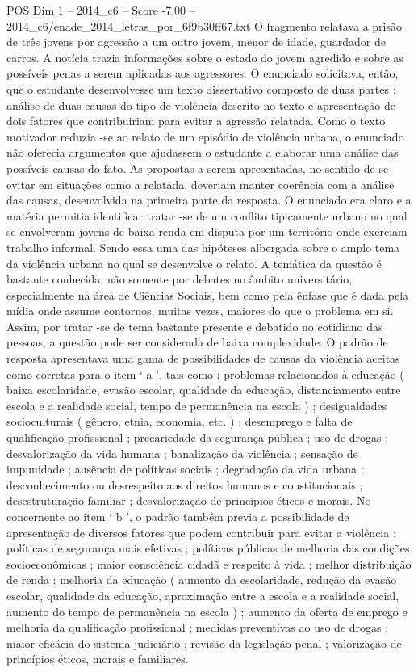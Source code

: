 \begin{textsample}{POS Dim 1 – 2014\_c6 – Score -7.00 – 2014\_c6/enade\_2014\_letras\_por\_6f9b30ff67.txt}
O fragmento relatava a prisão de três jovens por agressão a um outro jovem, menor de idade, guardador de carros.
A notícia trazia informações sobre o estado do jovem agredido e sobre as possíveis penas a serem aplicadas aos agressores.
O enunciado solicitava, então, que o estudante desenvolvesse um texto dissertativo composto de duas partes : análise de duas causas do tipo de violência descrito no texto e apresentação de dois fatores que contribuiriam para evitar a agressão relatada.
Como o texto motivador reduzia -se ao relato de um episódio de violência urbana, o enunciado não oferecia argumentos que ajudassem o estudante a elaborar uma análise das possíveis causas do fato.
As propostas a serem apresentadas, no sentido de se evitar em situações como a relatada, deveriam manter coerência com a análise das causas, desenvolvida na primeira parte da resposta.
O enunciado era claro e a matéria permitia identificar tratar -se de um conflito tipicamente urbano no qual se envolveram jovens de baixa renda em disputa por um território onde exerciam trabalho informal.
Sendo essa uma das hipóteses albergada sobre o amplo tema da violência urbana no qual se desenvolve o relato.
A temática da questão é bastante conhecida, não somente por debates no âmbito universitário, especialmente na área de Ciências Sociais, bem como pela ênfase que é dada pela mídia onde assume contornos, muitas vezes, maiores do que o problema em si.
Assim, por tratar -se de tema bastante presente e debatido no cotidiano das pessoas, a questão pode ser considerada de baixa complexidade.
O padrão de resposta apresentava uma gama de possibilidades de causas da violência aceitas como corretas para o item ‘ a ’, tais como : problemas relacionados à educação ( baixa escolaridade, evasão escolar, qualidade da educação, distanciamento entre escola e a realidade social, tempo de permanência na escola ) ; desigualdades socioculturais ( gênero, etnia, economia, etc. ) ; desemprego e falta de qualificação profissional ; precariedade da segurança pública ; uso de drogas ; desvalorização da vida humana ; banalização da violência ; sensação de impunidade ; ausência de políticas sociais ; degradação da vida urbana ; desconhecimento ou desrespeito aos direitos humanos e constitucionais ; desestruturação familiar ; desvalorização de princípios éticos e morais.
No concernente ao item ‘ b ’, o padrão também previa a possibilidade de apresentação de diversos fatores que podem contribuir para evitar a violência : políticas de segurança mais efetivas ; políticas públicas de melhoria das condições socioeconômicas ; maior consciência cidadã e respeito à vida ; melhor distribuição de renda ; melhoria da educação ( aumento da escolaridade, redução da evasão escolar, qualidade da educação, aproximação entre a escola e a realidade social, aumento do tempo de permanência na escola ) ; aumento da oferta de emprego e melhoria da qualificação profissional ; medidas preventivas ao uso de drogas ; maior eficácia do sistema judiciário ; revisão da legislação penal ; valorização de princípios éticos, morais e familiares.

\end{textsample}
